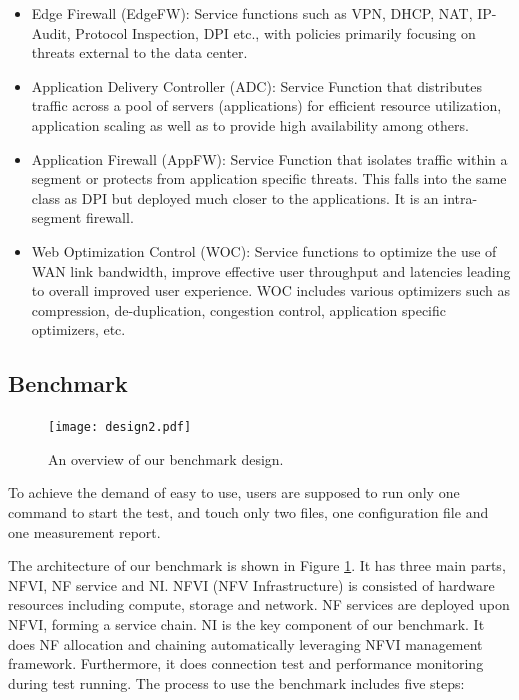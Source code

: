 \documentclass{sig-alternate-10pt}
\begin{document}
\begin{itemize}
\item
Edge Firewall (EdgeFW): Service functions such as VPN, DHCP, NAT, IP-Audit, Protocol Inspection, DPI etc., with policies primarily focusing on threats external to the data center.

\item
Application Delivery Controller (ADC): Service Function that distributes traffic across a pool of servers (applications) for efficient resource utilization, application scaling as well as to provide high availability among others.

\item
Application Firewall (AppFW): Service Function that isolates traffic within a segment or protects from application specific threats. This falls into the same class as DPI but deployed much closer to the applications. It is an intra-segment firewall.

\item
Web Optimization Control (WOC): Service functions to optimize the use of WAN link bandwidth, improve effective user throughput and latencies leading to overall improved user experience. WOC includes various optimizers such as compression, de-duplication, congestion control, application specific optimizers, etc. %
\end{itemize}


\subsection{Benchmark}

\begin{figure}[!t]
\centering
\texttt{[image: design2.pdf]}
\caption{An overview of our benchmark design.}
\label{design}
\end{figure}

To achieve the demand of easy to use,
users are supposed to run only one command to start the test,
and touch only two files,
one configuration file and one measurement report.

The architecture of our benchmark is shown in Figure \ref{design}.
It has three main parts, NFVI, NF service and NI.
NFVI (NFV Infrastructure) is consisted of hardware resources
including compute, storage and network.
NF services are deployed upon NFVI, forming a service chain.
NI is the key component of our benchmark.
It does NF allocation and chaining automatically leveraging NFVI management framework.
Furthermore, it does connection test and performance monitoring during test running.
The process to use the benchmark includes five steps:
\end{document}
